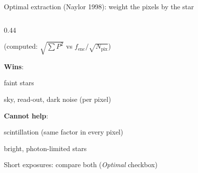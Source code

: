 \begin{frame}{Optimal extraction (Naylor 1998): weight the pixels by the star}
\begin{columns}[T]
\begin{column}{0.44\textwidth}
    {\scriptsize (computed: $\sqrt{\sum P^2}$ vs $f_\mathrm{enc}/\sqrt{N_\mathrm{pix}}$)\par}
    \raggedright\vspace{0.8ex}
    \begin{tcolorbox}[colback=syzaccent!8, colframe=syzaccent!60, boxrule=0.4pt, arc=2pt, left=3pt, right=3pt]
      \scriptsize
      \textbf{Wins}:
      \begin{tightlist}
        \item faint stars
        \item sky, read-out, dark noise (per pixel)
      \end{tightlist}
      \textbf{Cannot help}:
      \begin{tightlist}
        \item scintillation (same factor in every pixel)
        \item bright, photon-limited stars
      \end{tightlist}
      Short exposures: compare both (\emph{Optimal} checkbox)
    \end{tcolorbox}
  \end{column}
  \end{columns}
\end{frame}

